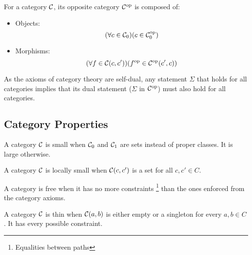 \begin{definition}
  For a category $\mathcal{C}$, its opposite category $\mathcal{C}^{\mathrm{op}}$ is composed of:
  \parencite{awodey:category_theory}
  \begin{itemize}
    \item Objects:
      \[(\forall c \in \mathcal{C}_0)
        (c\in \mathcal{C}^{\mathrm{op}}_0)\]
    \item Morphisms:
      \[(\forall f \in \mathcal{C}(c, c'))
        (f^{\mathrm{op}} \in \mathcal{C}^{\mathrm{op}}(c', c))\]
  \end{itemize}
\end{definition}

\begin{remark}
  As the axioms of category theory are self-dual, any statement $\Sigma$ that
  holds for all categories implies that its dual statement ($\Sigma$ in
  $\mathcal{C}^{\mathrm{op}}$) must also hold for all categories.
  \parencite{awodey:category_theory}
\end{remark}

\subsection{Category Properties}

\begin{definition}
  A category $\mathcal{C}$ is small when $\mathcal{C}_0$ and $\mathcal{C}_1$ are sets instead of proper
  classes. It is large otherwise.
  \parencite{awodey:category_theory}
\end{definition}

\begin{definition}
  A category $\mathcal{C}$ is locally small when $\mathcal{C}(c, c')$ is a set for all $c,c'\in
  C$. \parencite{awodey:category_theory}
\end{definition}

\begin{definition}
  A category is free when it has no more constraints \footnote{Equalities
  between paths} than the ones enforced from the category axioms.
  \parencite{adamek_herrlich_strecker:joy_cats}
\end{definition}

\begin{definition}
  A category $\mathcal{C}$ is thin when $\mathcal{C}(a, b)$ is either empty or a singleton for
  every $a,b\in C$. \parencite{adamek_herrlich_strecker:joy_cats} It has every
  possible constraint.
\end{definition}

